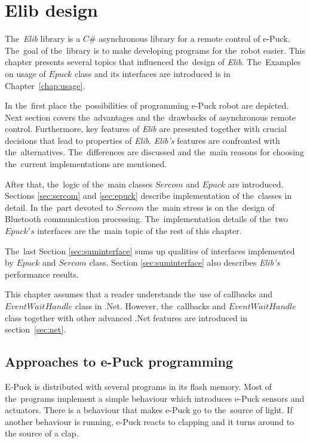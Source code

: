 \chapter{Elib design} \label{chap:elib}
  The~{\it Elib} library is a $C\#$ asynchronous library for a remote control of e-Puck. 
  The~goal of the~library is to make developing programs for the~robot easier.
  This chapter presents several topics that influenced the~design of {\it Elib}.
  The~Examples on usage of $Epuck$ class and its interfaces are introduced is in Chapter~\ref{chap:usage}.

  In the~first place the~possibilities of programming e-Puck robot are depicted.
  Next section covers the~advantages and the~drawbacks of asynchronous remote control.
  Furthermore, key features of {\it Elib} are presented together with crucial decisions that
  lead to properties of {\it Elib}. 
  {\it Elib's} features are confronted with the~alternatives. The~differences are discussed
  and the~main reasons for choosing the~current implementations are mentioned.

  After that, the~logic of the~main classes $Sercom$ and $Epuck$ are introduced. Sections 
  \ref{sec:sercom} and \ref{sec:epuck} describe implementation of the~classes in detail. 
  In the~part devoted to $Sercom$ the~main stress is on the~design of Bluetooth communication processing.
  The~implementation details of the~two $Epuck's$ interfaces are the~main topic of the rest of this chapter. 

  The~last Section \ref{sec:suminterface} sums up qualities of interfaces 
  implemented by $Epuck$ and $Sercom$ class.
  Section \ref{sec:suminterface} also describes {\it Elib's} performance results.

  This chapter assumes that a reader understands the~use of callbacks 
  and $EventWaitHandle$ class in .Net.
  However, the~callbacks and $EventWaitHandle$ class together with other advanced .Net features 
  are introduced in section~\ref{sec:net}.

\section{Approaches to e-Puck programming} \label{sec:approach}
  E-Puck is distributed with several programs in its flash memory. 
  Most of the~programs implement a simple behaviour which introduces e-Puck sensors and actuators.
  There is a behaviour that makes e-Puck go to the~source of light.
  If another behaviour is running, e-Puck
  reacts to clapping and it turns around to the source of a clap. 
   
